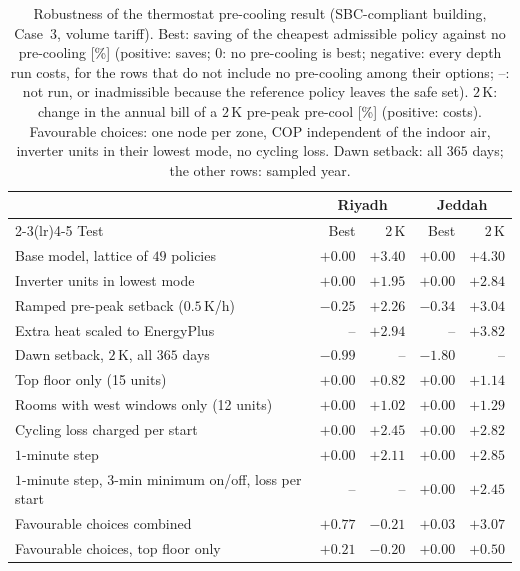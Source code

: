 \documentclass[10pt,a4paper,twocolumn]{article}
\theoremstyle{definition}
\begin{document}
\begin{table}[t]
\centering\footnotesize\setlength{\tabcolsep}{4pt}
\caption{Robustness of the thermostat pre-cooling result (SBC-compliant building, Case~3, volume tariff). Best: saving of the cheapest admissible policy against no pre-cooling [\%] (positive: saves; $0$: no pre-cooling is best; negative: every depth run costs, for the rows that do not include no pre-cooling among their options; --: not run, or inadmissible because the reference policy leaves the safe set). $2\,$K: change in the annual bill of a $2\,$K pre-peak pre-cool [\%] (positive: costs). Favourable choices: one node per zone, COP independent of the indoor air, inverter units in their lowest mode, no cycling loss. Dawn setback: all $365$ days; the other rows: sampled year.}
\label{S:precoolrobust}
\begin{tabularx}{\linewidth}{@{}X r r r r@{}}
\toprule
 & \multicolumn{2}{c}{Riyadh} & \multicolumn{2}{c}{Jeddah} \\
\cmidrule(lr){2-3}\cmidrule(lr){4-5}
Test & Best & $2\,$K & Best & $2\,$K \\
\midrule
Base model, lattice of $49$ policies & $+0.00$ & $+3.40$ & $+0.00$ & $+4.30$ \\
Inverter units in lowest mode & $+0.00$ & $+1.95$ & $+0.00$ & $+2.84$ \\
Ramped pre-peak setback ($0.5\,$K/h) & $-0.25$ & $+2.26$ & $-0.34$ & $+3.04$ \\
Extra heat scaled to EnergyPlus & -- & $+2.94$ & -- & $+3.82$ \\
Dawn setback, $2\,$K, all $365$ days & $-0.99$ & -- & $-1.80$ & -- \\
Top floor only (15 units) & $+0.00$ & $+0.82$ & $+0.00$ & $+1.14$ \\
Rooms with west windows only (12 units) & $+0.00$ & $+1.02$ & $+0.00$ & $+1.29$ \\
Cycling loss charged per start & $+0.00$ & $+2.45$ & $+0.00$ & $+2.82$ \\
$1$-minute step & $+0.00$ & $+2.11$ & $+0.00$ & $+2.85$ \\
$1$-minute step, $3$-min minimum on/off, loss per start & -- & -- & $+0.00$ & $+2.45$ \\
Favourable choices combined & $+0.77$ & $-0.21$ & $+0.03$ & $+3.07$ \\
Favourable choices, top floor only & $+0.21$ & $-0.20$ & $+0.00$ & $+0.50$ \\
\bottomrule
\end{tabularx}
\end{table}
\end{document}
